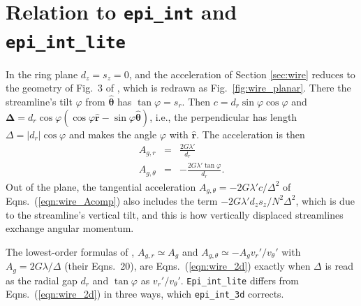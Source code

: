 \documentclass[twocolumn]{aastex702}
\newcommand{\code}[1]{\texttt{#1}}   %
\begin{document}
\clearpage
\appendix

\section{Relation to \code{epi\_int} and \code{epi\_int\_lite}}
\label{sec:appendix_wire2d}
\setcounter{equation}{0}

In the ring plane $d_z = s_z = 0$, and the acceleration of Section \ref{sec:wire} reduces to the geometry of
Fig.~3 of \cite{HS13}, which is redrawn as Fig.~\ref{fig:wire_planar}. There the streamline's tilt
$\varphi$ from $\hat{\boldsymbol{\theta}}$ has $\tan\varphi = s_r$. Then $c = d_r\sin\varphi\cos\varphi$
and $\boldsymbol{\Delta} = d_r\cos\varphi(\cos\varphi\hat{\mathbf{r}} - \sin\varphi\hat{\boldsymbol{\theta}})$, i.e., the perpendicular has
length $\Delta = |d_r|\cos\varphi$ and makes the angle $\varphi$ with $\hat{\mathbf{r}}$. The acceleration is
then
\begin{subequations}
\label{eqn:wire_2d}
\begin{eqnarray}
    A_{g,r} &=& \frac{2G\lambda'}{d_r} \label{eqn:wire_2d_a}\\
    A_{g,\theta} &=& -\frac{2G\lambda'\tan\varphi}{d_r}. \label{eqn:wire_2d_b}
\end{eqnarray}
\end{subequations}
Out of the plane, the tangential acceleration $A_{g,\theta} = -2G\lambda'c/\Delta^2$ of Eqns.\ (\ref{eqn:wire_Acomp}) also includes the
term $-2G\lambda'd_zs_z/N^2\Delta^2$, which is due to the streamline's vertical tilt, and this is how
vertically displaced streamlines exchange angular momentum.

The lowest-order formulas of \cite{HS13}, $A_{g,r} \simeq A_g$ and $A_{g,\theta} \simeq -A_gv_r'/v_\theta'$ with
$A_g = 2G\lambda/\Delta$ (their Eqns.\ 20), are Eqns.\ (\ref{eqn:wire_2d}) exactly when $\Delta$ is read as the
radial gap $d_r$ and $\tan\varphi$ as $v_r'/v_\theta'$. \code{Epi\_int\_lite} \citep{H25} differs from
Eqns.\ (\ref{eqn:wire_2d}) in three ways, which \code{epi\_int\_3d} corrects.
\end{document}
